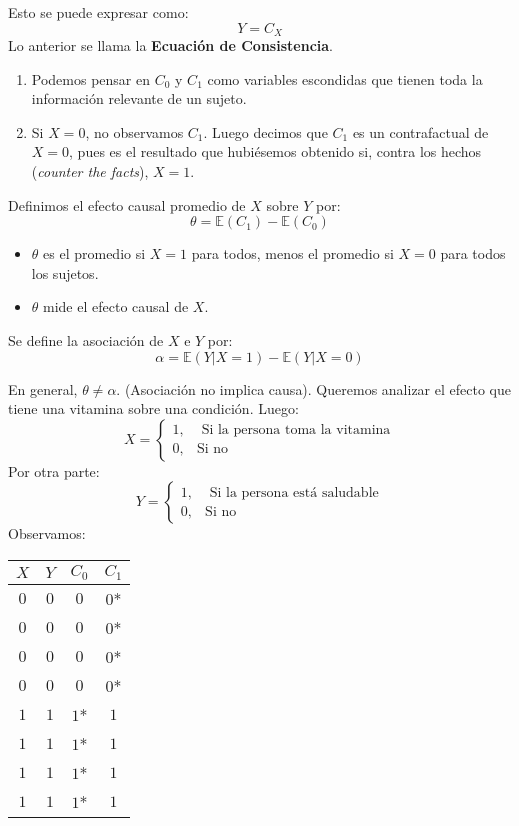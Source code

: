 Esto se puede expresar como: 
$$
Y=C_{X}
$$
Lo anterior se llama la \textbf{Ecuación de Consistencia}. 
\begin{remark}
\begin{enumerate}
    \item Podemos pensar en $C_0$ y $C_1$ como variables escondidas que tienen toda la información relevante de un sujeto. 
    \item Si $X=0$, no observamos $C_1$. Luego decimos que $C_1$ es un contrafactual de $X=0$, pues es el resultado que hubiésemos obtenido si, contra los hechos (\emph{counter the facts}), $X=1. $
\end{enumerate}
\end{remark}

 Definimos el efecto causal promedio de $X$ sobre $Y$ por:
$$
\theta= \mathbb{E}(C_1)- \mathbb{E}(C_0)
$$

\begin{remark}
\begin{itemize}
    \item $\theta$ es el promedio si $X=1$ para todos, menos el promedio si $X=0$ para todos los sujetos.  
    \item $\theta$ mide el efecto causal de $X$. 
\end{itemize}
\end{remark}

 Se define la asociación de $X$ e $Y$ por: 
$$
\alpha= \mathbb{E}(Y|X=1)- \mathbb{E}(Y|X=0)
$$

\theorem En general, $\theta \not = \alpha$. (Asociación no implica causa). 
\example Queremos analizar el efecto que tiene una vitamina sobre una condición. Luego: 
$$
X= \begin{cases}
      1, &  \text{ Si la persona toma la vitamina} \\
		0, & \text{Si no }
    \end{cases}
$$
Por otra parte: 
$$
Y= \begin{cases}
      1, &  \text{ Si la persona está saludable} \\
		0, & \text{Si no }
    \end{cases}
$$
Observamos: 
\begin{center}
\begin{tabular}{cccc}
$X$ & $Y$ & $C_0$ & $C_1$ \\ \hline
$0$ & $0$ & $0$ & $0$* \\ 
$0$ & $0$ & $0$ & $0$* \\ 
$0$ & $0$ & $0$ & $0$* \\ 
$0$ & $0$ & $0$ & $0$* \\  \hline
$1$ & $1$ & $1$*& $1$ \\ 
$1$ & $1$ & $1$* & $1$ \\ 
$1$ & $1$ & $1$* & $1$ \\ 
$1$ & $1$ & $1$* & $1$ \\  
\end{tabular}
\end{center}

